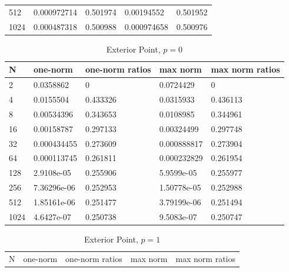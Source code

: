 \documentclass{article} %
\theoremstyle{plain}
\numberwithin{equation}{section} %
\numberwithin{figure}{section} %
\numberwithin{table}{section} %
\begin{document}
\begin{enumerate}[\ \ (a)]
\begin{table}
\begin{tabular}[ht!]{lllll}
                  512 & 0.000972714 &          0.501974 & 0.00194552  &          0.501952 \\
                 1024 & 0.000487318 &          0.500988 & 0.000974658 &          0.500976 \\
                \hline
            \end{tabular}
        \end{table}
        \begin{table}
            \centering
            \caption{Exterior Point, $p=0$}
            \begin{tabular}[ht!]{lllll}
                \hline
                    N &    one-norm &   one-norm ratios &    max norm &   max norm ratios \\
                \hline
                    2 & 0.0358862   &          0        & 0.0724429   &          0        \\
                    4 & 0.0155504   &          0.433326 & 0.0315933   &          0.436113 \\
                    8 & 0.00534396  &          0.343653 & 0.0108985   &          0.344961 \\
                   16 & 0.00158787  &          0.297133 & 0.00324499  &          0.297748 \\
                   32 & 0.000434455 &          0.273609 & 0.000888817 &          0.273904 \\
                   64 & 0.000113745 &          0.261811 & 0.000232829 &          0.261954 \\
                  128 & 2.9108e-05  &          0.255906 & 5.9599e-05  &          0.255977 \\
                  256 & 7.36296e-06 &          0.252953 & 1.50778e-05 &          0.252988 \\
                  512 & 1.85161e-06 &          0.251477 & 3.79199e-06 &          0.251494 \\
                 1024 & 4.6427e-07  &          0.250738 & 9.5083e-07  &          0.250747 \\
                \hline
            \end{tabular}
        \end{table}
        \begin{table}
            \centering
            \caption{Exterior Point, $p=1$}
            \begin{tabular}[ht!]{lllll}
                \hline
                    N &    one-norm &   one-norm ratios &    max norm &   max norm ratios \\

\end{tabular}
\end{table}
\end{enumerate}
\end{document}
